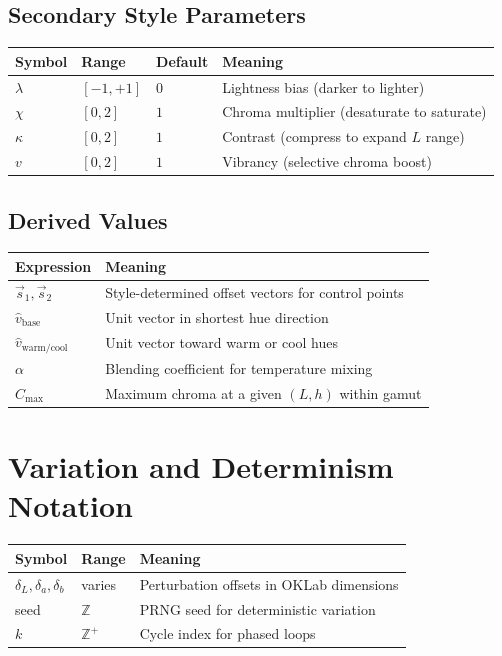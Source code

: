 \subsection{Secondary Style Parameters}

\begin{center}
\begin{tabular}{llll}
  \toprule
  \textbf{Symbol} & \textbf{Range} & \textbf{Default} & \textbf{Meaning} \\
  \midrule
  $\lambda$ & $[-1, +1]$ & $0$ & Lightness bias (darker to lighter) \\
  $\chi$ & $[0, 2]$ & $1$ & Chroma multiplier (desaturate to saturate) \\
  $\kappa$ & $[0, 2]$ & $1$ & Contrast (compress to expand $L$ range) \\
  $v$ & $[0, 2]$ & $1$ & Vibrancy (selective chroma boost) \\
  \bottomrule
\end{tabular}
\end{center}

\subsection{Derived Values}

\begin{center}
\begin{tabular}{ll}
  \toprule
  \textbf{Expression} & \textbf{Meaning} \\
  \midrule
  $\vec{s}_1, \vec{s}_2$ & Style-determined offset vectors for control points \\
  $\hat{v}_{\text{base}}$ & Unit vector in shortest hue direction \\
  $\hat{v}_{\text{warm/cool}}$ & Unit vector toward warm or cool hues \\
  $\alpha$ & Blending coefficient for temperature mixing \\
  $C_{\max}$ & Maximum chroma at a given $(L, h)$ within gamut \\
  \bottomrule
\end{tabular}
\end{center}

\section{Variation and Determinism Notation}
\label{sec:notation-variation}

\begin{center}
\begin{tabular}{lll}
  \toprule
  \textbf{Symbol} & \textbf{Range} & \textbf{Meaning} \\
  \midrule
  $\delta_L, \delta_a, \delta_b$ & varies & Perturbation offsets in OKLab dimensions \\
  seed & $\mathbb{Z}$ & PRNG seed for deterministic variation \\
  $k$ & $\mathbb{Z}^+$ & Cycle index for phased loops \\
  \bottomrule
\end{tabular}
\end{center}

